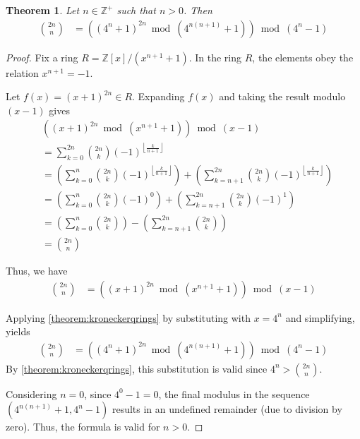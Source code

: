 \documentclass[11pt,reqno]{article}
\theoremstyle{plain}
\newtheorem{theorem}{Theorem}
\theoremstyle{definition}
\newcommand{\floor}[1]{\left\lfloor #1 \right\rfloor}
\begin{document}
\begin{theorem} \label{theorem:cbc}
Let $n \in \mathbb{Z}^+$ such that $n > 0$. Then
\begin{align*}
\binom{2n}{n} &= \left((4^n + 1)^{2n} \bmod{(4^{n(n+1)} + 1)}\right) \bmod{(4^n-1)}
\end{align*}
\end{theorem}
\begin{proof}
Fix a ring $R = \mathbb{Z}[x]/(x^{n+1} + 1)$. In the ring $R$, the elements obey the relation $x^{n+1} = -1$.

Let $f(x) = (x + 1)^{2n} \in R$. Expanding $f(x)$ and taking the result modulo $(x-1)$ gives
\begin{align*}
& ((x + 1)^{2n} \bmod{(x^{n+1} + 1)}) \bmod{(x-1)} \\
&= \sum_{k=0}^{2n} \binom{2n}{k} (-1)^{\floor{\frac{k}{n+1}}} \\
&= \left( \sum_{k=0}^{n} \binom{2n}{k} (-1)^{\floor{\frac{k}{n+1}}} \right) + \left( \sum_{k=n+1}^{2n} \binom{2n}{k} (-1)^{\floor{\frac{k}{n+1}}} \right) \\
&= \left( \sum_{k=0}^{n} \binom{2n}{k} (-1)^0 \right) + \left( \sum_{k=n+1}^{2n} \binom{2n}{k} (-1)^1 \right) \\
&= \left( \sum_{k=0}^{n} \binom{2n}{k} \right) - \left( \sum_{k=n+1}^{2n} \binom{2n}{k} \right) \\
&= \binom{2n}{n}
\end{align*}

Thus, we have
\begin{align*}
    \binom{2n}{n} &= \left((x + 1)^{2n} \bmod{(x^{n+1} + 1)}\right) \bmod{(x-1)}
\end{align*}

Applying \cref{theorem:kroneckerqrings} by substituting with $x = 4^n$ and simplifying, yields
\begin{align*}
    \binom{2n}{n} &= \left((4^n + 1)^{2n} \bmod{(4^{n(n+1)} + 1)}\right) \bmod{(4^n-1)}
\end{align*}
By \cref{theorem:kroneckerqrings}, this substitution is valid since $4^n > \binom{2n}{n}$.

Considering $n = 0$, since $4^0-1 = 0$, the final modulus in the sequence $(4^{n(n+1)} + 1, 4^n-1)$ results in an undefined remainder (due to division by zero). Thus, the formula is valid for $n > 0$.
\end{proof}
\end{document}
